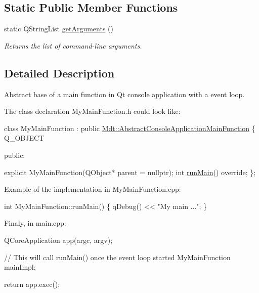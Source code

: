 \subsection*{Static Public Member Functions}
\begin{DoxyCompactItemize}
\item 
static Q\+String\+List \hyperlink{class_mdt_1_1_abstract_console_application_main_function_a4bfe1909139f3c30b03797f7778290fb}{get\+Arguments} ()
\begin{DoxyCompactList}\small\item\em Returns the list of command-\/line arguments. \end{DoxyCompactList}\end{DoxyCompactItemize}


\subsection{Detailed Description}
Abstract base of a main function in Qt console application with a event loop. 

The class declaration My\+Main\+Function.\+h could look like\+: 
\begin{DoxyCode}
\textcolor{keyword}{class }MyMainFunction : \textcolor{keyword}{public} \hyperlink{class_mdt_1_1_abstract_console_application_main_function}{Mdt::AbstractConsoleApplicationMainFunction}
\{
 Q\_OBJECT

 \textcolor{keyword}{public}:

  \textcolor{keyword}{explicit} MyMainFunction(QObject* parent = \textcolor{keyword}{nullptr});
  \textcolor{keywordtype}{int} \hyperlink{class_mdt_1_1_abstract_console_application_main_function_a34213b6ac2188b3620f5c2f5ce4ee287}{runMain}() \textcolor{keyword}{override};
\};
\end{DoxyCode}


Example of the implementation in My\+Main\+Function.\+cpp\+: 
\begin{DoxyCode}
\textcolor{keywordtype}{int} MyMainFunction::runMain()
\{
  qDebug() << \textcolor{stringliteral}{"My main ..."};
\}
\end{DoxyCode}


Finaly, in main.\+cpp\+: 
\begin{DoxyCode}
QCoreApplication app(argc, argv);

\textcolor{comment}{// This will call runMain() once the event loop started}
MyMainFunction mainImpl;

\textcolor{keywordflow}{return} app.exec();
\end{DoxyCode}
 

